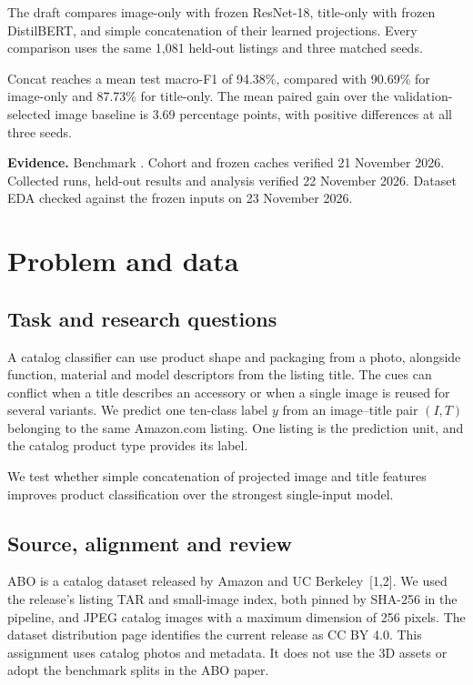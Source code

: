 \documentclass[final]{hcmut-report}
\newcommand{\code}[1]{\texttt{\detokenize{#1}}}
\begin{document}
The draft compares image-only with frozen ResNet-18, title-only with frozen DistilBERT, and simple concatenation of their learned projections. Every comparison uses the same 1,081 held-out listings and three matched seeds.

Concat reaches a mean test macro-F1 of 94.38\%, compared with 90.69\% for image-only and 87.73\% for title-only. The mean paired gain over the validation-selected image baseline is 3.69 percentage points, with positive differences at all three seeds.

\tableofcontents
\vfill
{\small\textbf{Evidence.} Benchmark \code{abo-v1-main}. Cohort and frozen caches verified 21 November 2026. Collected runs, held-out results and analysis verified 22 November 2026. Dataset EDA checked against the frozen inputs on 23 November 2026.}

\clearpage
{}
\fontsize{12}{14.4}\selectfont
\section{Problem and data}
\subsection{Task and research questions}
A catalog classifier can use product shape and packaging from a photo, alongside function, material and model descriptors from the listing title. The cues can conflict when a title describes an accessory or when a single image is reused for several variants. We predict one ten-class label \(y\) from an image--title pair \((I,T)\) belonging to the same Amazon.com listing. One listing is the prediction unit, and the catalog product type provides its label.

We test whether simple concatenation of projected image and title features improves product classification over the strongest single-input model.

\subsection{Source, alignment and review}
ABO is a catalog dataset released by Amazon and UC Berkeley~[1,2]. We used the release's listing TAR and small-image index, both pinned by SHA-256 in the pipeline, and JPEG catalog images with a maximum dimension of 256 pixels. The dataset distribution page identifies the current release as CC BY 4.0. This assignment uses catalog photos and metadata. It does not use the 3D assets or adopt the benchmark splits in the ABO paper.
\end{document}

